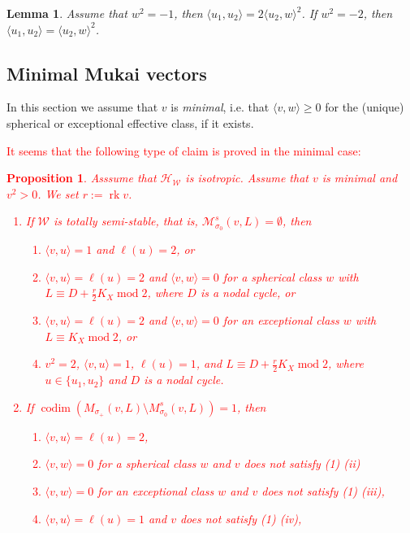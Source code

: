 \documentclass[leqno,11pt]{amsart}
\def\codim{\mathop{\mathrm{codim}}\nolimits}
\def\mod{\mathop{\mathrm{mod}}\nolimits}
\def\rk{\mathop{\mathrm{rk}}}
\newtheorem{Prop}[Thm]{Proposition}
\newtheorem{Lem}[Thm]{Lemma}
\theoremstyle{definition}
\def\HH{\ensuremath{\mathcal H}}
\def\MM{\ensuremath{\mathcal M}}
\def\WW{\ensuremath{\mathcal W}}
\begin{document}
\begin{Lem}
Assume that $w^2=-1$, then
$\langle u_1,u_2 \rangle=2\langle u_2,w \rangle^2$.  If $w^2=-2$, then $\langle u_1,u_2\rangle=\langle u_2,w\rangle^2$.
\end{Lem}




\subsection{Minimal Mukai vectors}
In this section we assume that $v$ is \emph{minimal}, i.e. that $\langle v,w\rangle\geq 0$ for the (unique) spherical or exceptional effective class, if it exists.  

\textcolor{red}{
It seems that the following type of claim is proved in the minimal case: 
\begin{Prop}\label{Prop:isotropic-classification}
Asssume that $\HH_{\WW}$ is isotropic.
Assume that $v$ is minimal and $v^2>0$.
We set $r:=\rk v$.
\begin{enumerate}
\item[(1)]
If $\WW$ is totally semi-stable, that is, $\MM_{\sigma_0}^s(v,L)=\emptyset$, then
\begin{enumerate}
\item[(i)] $\langle v,u \rangle=1$ and $\ell(u)=2$, or 
\item[(ii)] $\langle v,u \rangle=\ell(u)=2$ and 
$\langle v,w \rangle=0$ for a spherical class $w$ with 
$L\equiv D+\frac{r}{2}K_X \mod 2$,
where $D$ is a nodal cycle, or 
\item[(iii)]
$\langle v,u \rangle=\ell(u)=2$ and 
$\langle v,w \rangle=0$ for an exceptional class $w$ with 
$L \equiv K_X \mod 2$, 
or
\item[(iv)] $v^2=2$, $\langle v,u \rangle=1$, $\ell(u)=1$, 
and $L \equiv D+\frac{r}{2}K_X \mod 2$, 
where $u \in \{u_1,u_2 \}$ and $D$ is a nodal cycle.
\end{enumerate}
\item[(2)]
If $\codim(M_{\sigma_+}(v,L) \setminus M_{\sigma_0}^s(v,L))=1$, then 
\begin{enumerate}
\item[(i)] $\langle v,u \rangle=\ell(u)=2$, 
\item[(ii)] $\langle v,w \rangle=0$
for a spherical class $w$ 
and $v$ does not satisfy (1) (ii)
\item[(iii)] 
$\langle v,w \rangle=0$
for an exceptional class $w$
and $v$ does not satisfy (1) (iii),
\item[(iv)]
$\langle v,u \rangle=\ell(u)=1$ and $v$ does not satisfy (1) (iv), 

\end{enumerate}
\end{enumerate}
\end{Prop}}
\end{document}
